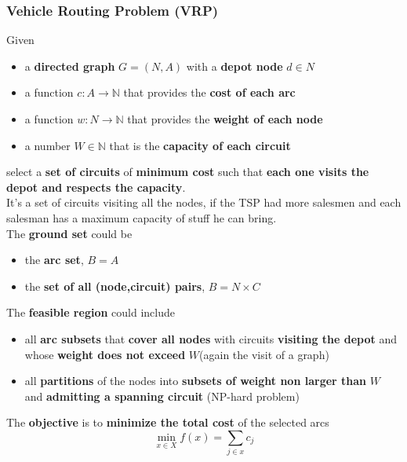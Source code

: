 \newpage

\subsubsection{Vehicle Routing Problem (VRP)}
Given
\begin{itemize}
	\item a \textbf{directed graph} $G = (N, A)$ with a \textbf{depot node} $d \in N$
	\item a function $c : A \rightarrow \mathbb{N}$ that provides the \textbf{cost of each arc}
	\item a function $w : N \rightarrow \mathbb{N}$ that provides the \textbf{weight of each node}
	\item a number $W \in \mathbb{N}$ that is the \textbf{capacity of each circuit}
\end{itemize}
select a \textbf{set of circuits} of \textbf{minimum cost} such that \textbf{each one visits the depot and respects the capacity}.\\
It's a set of circuits visiting all the nodes, if the TSP had more salesmen and each salesman has a maximum capacity of stuff he can bring.\\

The \textbf{ground set} could be
\begin{itemize}
	\item the \textbf{arc set}, $B = A$
	\item the \textbf{set of all (node,circuit) pairs}, $B = N \times C$
\end{itemize}

The \textbf{feasible region} could include
\begin{itemize}
	\item all \textbf{arc subsets} that \textbf{cover all nodes} with circuits \textbf{visiting the depot} and whose \textbf{weight does not exceed} $W $(again the visit of a graph)
	\item all \textbf{partitions} of the nodes into \textbf{subsets of weight non larger than} $W$ and \textbf{admitting a spanning circuit} (NP-hard problem)
\end{itemize}

The \textbf{objective} is to \textbf{minimize the total cost} of the selected arcs
$$ \min_{x \in X} f(x) = \sum_{j \in x} c_j $$

\newpage

